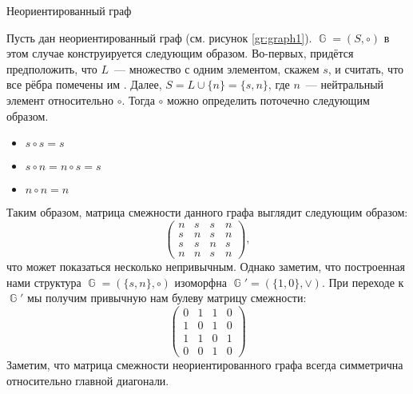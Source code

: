 \begin{marginfigure}    
    \begin{center}
        \resizebox{\marginparwidth}{!}{}
    \end{center}
    \caption{Неориентированный граф}
    \label{gr:graph1}
\end{marginfigure}
\begin{example}
    \label{exmpl:undirectedGraphMatrix}
    Пусть дан неориентированный граф (см. рисунок \ref{gr:graph1}).
    $\BbbG = (S, \circ)$ в этом случае конструируется следующим образом.
    Во-первых, придётся предположить, что $L$~--- множество с одним элементом, скажем $s$, и считать, что все рёбра помечены им%
    .
    Далее, $S = L \cup{\{n\}} = \{s,n\}$, где $n$~--- нейтральный элемент относительно $\circ$.
    Тогда $\circ$ можно определить поточечно следующим образом.
    \begin{itemize}
        \item $s \circ s = s$
        \item $s \circ n = n \circ s = s$
        \item $n \circ n = n$
    \end{itemize}

    Таким образом, матрица смежности данного графа выглядит следующим образом:
    \[
        \begin{pmatrix}
            n & s & s & n \\
            s & n & s & n \\
            s & s & n & s \\
            n & n & s & n
        \end{pmatrix},
    \]
    что может показаться несколько непривычным.
    Однако заметим, что построенная нами структура $\BbbG = (\{s,n\}, \circ)$ изоморфна $\BbbG' = (\{1,0\}, \lor)$.
    При переходе к $\BbbG'$ мы получим привычную нам булеву матрицу смежности:
    \[
        \begin{pmatrix}
            0 & 1 & 1 & 0 \\
            1 & 0 & 1 & 0 \\
            1 & 1 & 0 & 1 \\
            0 & 0 & 1 & 0
        \end{pmatrix}
    \]
    Заметим, что матрица смежности неориентированного графа всегда симметрична относительно главной диагонали.
\end{example}

